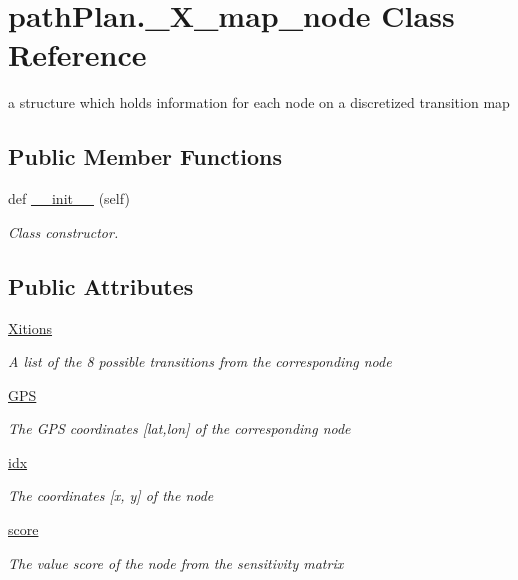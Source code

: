 \hypertarget{classpath_plan_1_1___x__map__node}{}\section{path\+Plan.\+\_\+\+X\+\_\+map\+\_\+node Class Reference}
\label{classpath_plan_1_1___x__map__node}


a structure which holds information for each node on a discretized transition map  


\subsection*{Public Member Functions}
\begin{DoxyCompactItemize}
\item 
def \mbox{\hyperlink{classpath_plan_1_1___x__map__node_a73f6059a5ffe61cf3c79d9ac682ccf92}{\+\_\+\+\_\+init\+\_\+\+\_\+}} (self)
\begin{DoxyCompactList}\small\item\em Class constructor. \end{DoxyCompactList}\end{DoxyCompactItemize}
\subsection*{Public Attributes}
\begin{DoxyCompactItemize}
\item 
\mbox{\hyperlink{classpath_plan_1_1___x__map__node_a6805d8c0c436764993a466767f4413b1}{Xitions}}
\begin{DoxyCompactList}\small\item\em A list of the 8 possible transitions from the corresponding node \end{DoxyCompactList}\item 
\mbox{\hyperlink{classpath_plan_1_1___x__map__node_a4d104762b4f90c3b130ff6292732299d}{G\+PS}}
\begin{DoxyCompactList}\small\item\em The G\+PS coordinates \mbox{[}lat,lon\mbox{]} of the corresponding node \end{DoxyCompactList}\item 
\mbox{\hyperlink{classpath_plan_1_1___x__map__node_ac9396adb5e65872faa6c73aa435cd66d}{idx}}
\begin{DoxyCompactList}\small\item\em The coordinates \mbox{[}x, y\mbox{]} of the node \end{DoxyCompactList}\item 
\mbox{\hyperlink{classpath_plan_1_1___x__map__node_ab3d03c1c32cbad7dfbd6defca6987b17}{score}}
\begin{DoxyCompactList}\small\item\em The value score of the node from the sensitivity matrix \end{DoxyCompactList}\end{DoxyCompactItemize}


